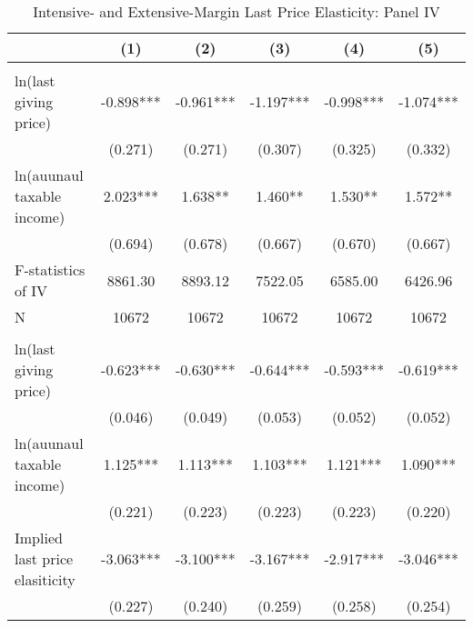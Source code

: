 \documentclass[ review  , 3p ]{elsarticle}
\begin{document}
  \begin{table}
  
  \caption{\label{tab:kableLastElasticity2}Intensive- and Extensive-Margin Last Price Elasticity: Panel IV}
  \centering
  \fontsize{8}{10}\selectfont
  \begin{threeparttable}
  \begin{tabular}[t]{lccccc}
  \toprule
   & (1) & (2) & (3) & (4) & (5)\\
  \midrule
  \addlinespace[0.3em]
  \multicolumn{6}{l}{\textbf{Intensive-Margin Elasticity}}\\
  \hspace{1em}ln(last giving price) & -0.898*** & -0.961*** & -1.197*** & -0.998*** & -1.074***\\
  \hspace{1em} & (0.271) & (0.271) & (0.307) & (0.325) & (0.332)\\
  \hspace{1em}ln(auunaul taxable income) & 2.023*** & 1.638** & 1.460** & 1.530** & 1.572**\\
  \hspace{1em} & (0.694) & (0.678) & (0.667) & (0.670) & (0.667)\\
  \hspace{1em}F-statistics of IV & 8861.30 & 8893.12 & 7522.05 & 6585.00 & 6426.96\\
  \hspace{1em}N & 10672 & 10672 & 10672 & 10672 & 10672\\
  \addlinespace[0.3em]
  \multicolumn{6}{l}{\textbf{Extensive-Margin Elasticity}}\\
  \hspace{1em}ln(last giving price) & -0.623*** & -0.630*** & -0.644*** & -0.593*** & -0.619***\\
  \hspace{1em} & (0.046) & (0.049) & (0.053) & (0.052) & (0.052)\\
  \hspace{1em}ln(auunaul taxable income) & 1.125*** & 1.113*** & 1.103*** & 1.121*** & 1.090***\\
  \hspace{1em} & (0.221) & (0.223) & (0.223) & (0.223) & (0.220)\\
  \hspace{1em}Implied last price elasiticity & -3.063*** & -3.100*** & -3.167*** & -2.917*** & -3.046***\\
  \hspace{1em} & (0.227) & (0.240) & (0.259) & (0.258) & (0.254)\\

\end{tabular}
\end{threeparttable}
\end{table}
\end{document}
